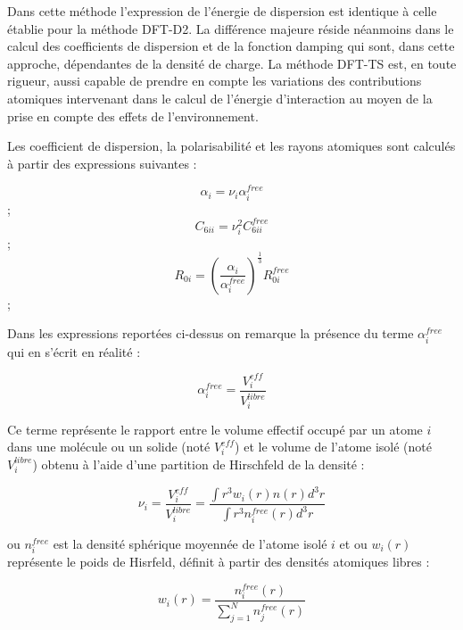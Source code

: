 Dans cette méthode l’expression de l'énergie de dispersion est identique à celle établie pour la méthode DFT-D2. La différence majeure réside néanmoins dans le calcul des coefficients de dispersion et de la fonction damping qui sont, dans cette approche, dépendantes de la densité de charge. La méthode DFT-TS est, en toute rigueur, aussi capable de prendre en compte les variations des contributions atomiques intervenant dans le calcul de l’énergie d’interaction au moyen de la prise en compte des effets de l’environnement. 
	
Les coefficient de dispersion, la polarisabilité et les rayons atomiques sont calculés à partir des expressions suivantes :

\begin{multicols}
\begin{equation} \alpha_{i} = \nu_{i} \alpha_{i}^{free} \end{equation};
\begin{equation} C_{6ii} = \nu_{i}^{2} C_{6ii}^{free} \end{equation}; 
\begin{equation} R_{0i} = \left(\frac{\alpha_{i}}{\alpha_{i}^{free}}\right)^{\frac{1}{3}} R_{0i}^{free} \end{equation}; 
\end{multicols}

Dans les expressions reportées ci-dessus on remarque la présence du terme $\alpha_{i}^{free}$ qui en s’écrit en réalité :

\begin{equation}
\alpha_{i}^{free} = \frac{V_{i}^{eff}}{V_{i}^{libre}}
\end{equation}

Ce terme représente le rapport entre le volume effectif occupé par un atome $i$ dans une molécule ou un solide (noté $V_{i}^{eff}$) et le volume de l’atome isolé (noté $V_{i}^{libre}$) obtenu à l’aide d’une partition de Hirschfeld de la densité :

\begin{equation}
\nu_{i} = \frac{V_{i}^{eff}}{V_{i}^{libre}} = \frac{\int r^{3} w_{i}(r)n(r)d^{3}r}{\int r^{3} n_{i}^{free} (r)d^{3}r}
\end{equation}
	
ou $n_{i}^{free}$ est la densité sphérique moyennée de l’atome isolé $i$ et ou $w_{i}(r)$ représente le poids de Hisrfeld, définit à partir des densités atomiques libres : 
	
\begin{equation}
w_{i}(r)= \frac{n_{i}^{free}(r)}{\sum_{j=1}^{N} n_{j}^{free}(r)}
\end{equation}
\bigskip

